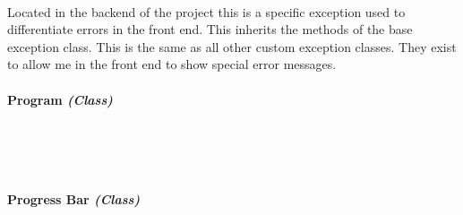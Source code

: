 \begin{FlushLeft}
    \begin{figure}[H]
        \centering
    \end{figure}\\
    Located in the backend of the project this is a specific exception used to differentiate errors in the front end. This inherits the methods of the base exception class. This is the same as all other custom exception classes. They exist to allow me in the front end to show special error messages.
    \bk

    \pagebreak
\paragraph{Program \textit{(Class)}} \mbox{} \\

    \begin{figure}[H]
        \centering
    \end{figure}\\

    \bk

    \pagebreak
\paragraph{Progress Bar \textit{(Class)}} \mbox{} \\


\end{FlushLeft}
